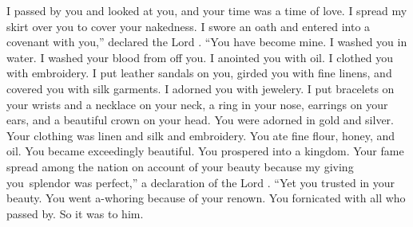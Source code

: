 
\begin{inparaenum}
   I passed by you and looked at you, and your time was a time of love. I spread my skirt over you to cover your nakedness. I swore an oath and entered into a covenant with you,'' declared the Lord \god. ``You have become mine.%
   I washed you in water. I washed your blood from off you. I anointed you with oil.%
   I clothed you with embroidery. I put leather sandals on you, girded you with fine linens, and covered you with silk garments.%
   I adorned you with jewelery. I put bracelets on your wrists and a necklace on your neck,%
   a ring in your nose, earrings on your ears, and a beautiful crown on your head.%
   You were adorned in gold and silver. Your clothing was linen and silk and embroidery. You ate fine flour, honey, and oil. You became exceedingly beautiful. You prospered into a kingdom.%
   Your fame spread among the nation on account of your beauty because my giving you\understood{}\ splendor was perfect,'' a declaration of the Lord \god.%
   ``Yet you trusted in your beauty. You went a-whoring because of your renown. You fornicated with all who passed by. So it was to him.%



\end{inparaenum}
